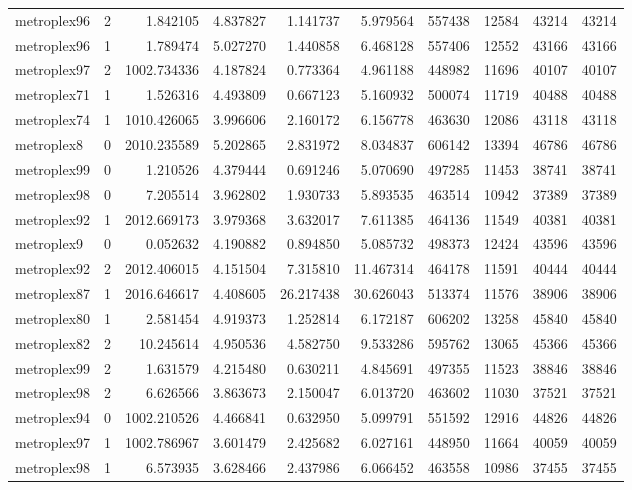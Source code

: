 \begin{longtable}{|l|r|r|r|r|r|r|r|r|r|}
metroplex96 & 2 & 1.842105 & 4.837827 & 1.141737 & 5.979564 & 557438 & 12584 & 43214 & 43214 \\
metroplex96 & 1 & 1.789474 & 5.027270 & 1.440858 & 6.468128 & 557406 & 12552 & 43166 & 43166 \\
metroplex97 & 2 & 1002.734336 & 4.187824 & 0.773364 & 4.961188 & 448982 & 11696 & 40107 & 40107 \\
metroplex71 & 1 & 1.526316 & 4.493809 & 0.667123 & 5.160932 & 500074 & 11719 & 40488 & 40488 \\
metroplex74 & 1 & 1010.426065 & 3.996606 & 2.160172 & 6.156778 & 463630 & 12086 & 43118 & 43118 \\
metroplex8 & 0 & 2010.235589 & 5.202865 & 2.831972 & 8.034837 & 606142 & 13394 & 46786 & 46786 \\
metroplex99 & 0 & 1.210526 & 4.379444 & 0.691246 & 5.070690 & 497285 & 11453 & 38741 & 38741 \\
metroplex98 & 0 & 7.205514 & 3.962802 & 1.930733 & 5.893535 & 463514 & 10942 & 37389 & 37389 \\
metroplex92 & 1 & 2012.669173 & 3.979368 & 3.632017 & 7.611385 & 464136 & 11549 & 40381 & 40381 \\
metroplex9 & 0 & 0.052632 & 4.190882 & 0.894850 & 5.085732 & 498373 & 12424 & 43596 & 43596 \\
metroplex92 & 2 & 2012.406015 & 4.151504 & 7.315810 & 11.467314 & 464178 & 11591 & 40444 & 40444 \\
metroplex87 & 1 & 2016.646617 & 4.408605 & 26.217438 & 30.626043 & 513374 & 11576 & 38906 & 38906 \\
metroplex80 & 1 & 2.581454 & 4.919373 & 1.252814 & 6.172187 & 606202 & 13258 & 45840 & 45840 \\
metroplex82 & 2 & 10.245614 & 4.950536 & 4.582750 & 9.533286 & 595762 & 13065 & 45366 & 45366 \\
metroplex99 & 2 & 1.631579 & 4.215480 & 0.630211 & 4.845691 & 497355 & 11523 & 38846 & 38846 \\
metroplex98 & 2 & 6.626566 & 3.863673 & 2.150047 & 6.013720 & 463602 & 11030 & 37521 & 37521 \\
metroplex94 & 0 & 1002.210526 & 4.466841 & 0.632950 & 5.099791 & 551592 & 12916 & 44826 & 44826 \\
metroplex97 & 1 & 1002.786967 & 3.601479 & 2.425682 & 6.027161 & 448950 & 11664 & 40059 & 40059 \\
metroplex98 & 1 & 6.573935 & 3.628466 & 2.437986 & 6.066452 & 463558 & 10986 & 37455 & 37455 \\

\end{longtable}
